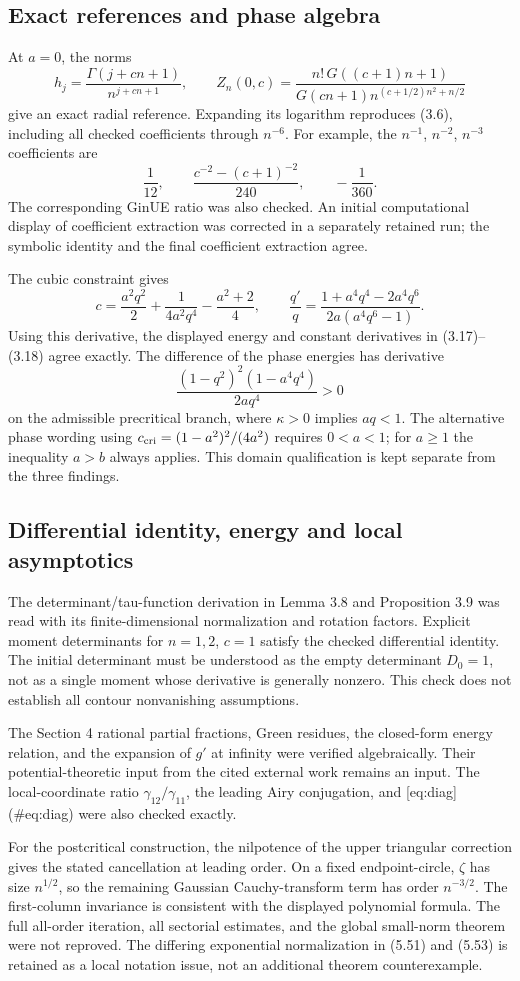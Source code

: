 \documentclass[10pt]{article}
\begin{document}
\subsection*{Exact references and phase algebra}
At \(a=0\), the norms \[h_j=\frac{\Gamma(j+cn+1)}{n^{j+cn+1}},\qquad
 Z_n(0,c)
 =\frac{n!\,G((c+1)n+1)}
        {G(cn+1)n^{(c+1/2)n^2+n/2}}\] give an exact radial reference. Expanding its logarithm reproduces (3.6), including all checked coefficients through \(n^{-6}\). For example, the \(n^{-1}\), \(n^{-2}\), \(n^{-3}\) coefficients are \[\frac1{12},\qquad
 \frac{c^{-2}-(c+1)^{-2}}{240},\qquad -\frac1{360}.\] The corresponding GinUE ratio was also checked. An initial computational display of coefficient extraction was corrected in a separately retained run; the symbolic identity and the final coefficient extraction agree.\par
The cubic constraint gives \[c=\frac{a^2q^2}{2}+\frac1{4a^2q^4}-\frac{a^2+2}{4},\qquad
 \frac{q'}q
 =\frac{1+a^4q^4-2a^4q^6}{2a(a^4q^6-1)} .\] Using this derivative, the displayed energy and constant derivatives in (3.17)–(3.18) agree exactly. The difference of the phase energies has derivative \[\frac{(1-q^2)^2(1-a^4q^4)}{2aq^4}>0\] on the admissible precritical branch, where \(\kappa>0\) implies \(aq<1\). The alternative phase wording using \(c_{\rm cri}=(1-a^2)^2/(4a^2)\) requires \(0<a<1\); for \(a\geq1\) the inequality \(a>b\) always applies. This domain qualification is kept separate from the three findings.\par
\subsection*{Differential identity, energy and local asymptotics}
The determinant/tau-function derivation in Lemma 3.8 and Proposition 3.9 was read with its finite-dimensional normalization and rotation factors. Explicit moment determinants for \(n=1,2\), \(c=1\) satisfy the checked differential identity. The initial determinant must be understood as the empty determinant \(D_0=1\), not as a single moment whose derivative is generally nonzero. This check does not establish all contour nonvanishing assumptions.\par
The Section 4 rational partial fractions, Green residues, the closed-form energy relation, and the expansion of \(g'\) at infinity were verified algebraically. Their potential-theoretic input from the cited external work remains an input. The local-coordinate ratio \(\gamma_{12}/\gamma_{11}\), the leading Airy conjugation, and [eq:diag] (\#eq:diag) were also checked exactly.\par
For the postcritical construction, the nilpotence of the upper triangular correction gives the stated cancellation at leading order. On a fixed endpoint-circle, \(\zeta\) has size \(n^{1/2}\), so the remaining Gaussian Cauchy-transform term has order \(n^{-3/2}\). The first-column invariance is consistent with the displayed polynomial formula. The full all-order iteration, all sectorial estimates, and the global small-norm theorem were not reproved. The differing exponential normalization in (5.51) and (5.53) is retained as a local notation issue, not an additional theorem counterexample.\par
\end{document}
